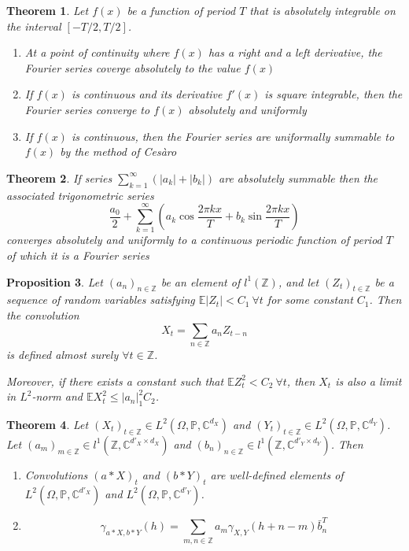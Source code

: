 \documentclass[12pt]{article}
\newtheorem{theorem}{Theorem}[section]
\newtheorem{proposition}[theorem]{Proposition}
\theoremstyle{definition}
\theoremstyle{remark}
\numberwithin{equation}{section}
\newcommand{\PP}{\mathbb{P}}
\newcommand{\ZZ}{\mathbb{Z}}
\newcommand{\CC}{\mathbb{C}}
\newcommand{\EE}{\mathbb{E}}
\begin{document}
\begin{theorem}
	Let $f(x)$ be a function of period $T$ that is absolutely integrable on the interval $[-T/2, T/2]$.
	\begin{enumerate}
		\item At a point of continuity where $f(x)$ has a right and a left derivative, the Fourier series coverge absolutely to the value $f(x)$
		\item If $f(x)$ is continuous and its derivative $f'(x)$ is square integrable, then the Fourier series converge to $f(x)$ absolutely and uniformly
		\item If $f(x)$ is continuous, then the Fourier series are uniformally summable to $f(x)$ by the method of Ces\`{a}ro
	\end{enumerate}
\end{theorem}

\begin{theorem}
	If series $\sum_{k=1}^{\infty}\left(|a_k| + |b_k|\right)$ are absolutely summable then the associated trigonometric series
\begin{equation*}
\frac {a_0} 2 + \sum_{k=1}^\infty \left( a_k \cos {\frac {2\pi kx}T}+b_k \sin {\frac {2\pi kx}T}\right)
\end{equation*}
	converges absolutely and uniformly to a continuous periodic function of period $T$ of which it is a Fourier series
\end{theorem}

\begin{proposition}
	Let $(a_n)_{n\in\ZZ}$ be an element of $l^1(\ZZ)$, and let $(Z_t)_{t\in\ZZ}$ be a sequence of random variables satisfying $\EE |Z_t| < C_1\ \forall t$ for some constant $C_1$. Then the convolution
	\begin{equation*}
		X_t = \sum_{n\in\ZZ}a_nZ_{t-n}
	\end{equation*}
	is defined almost surely $\forall t\in \ZZ$.

	Moreover, if there exists a constant such that $\EE Z_t^2 < C_2\ \forall t$, then $X_t$ is also a limit in $L^2$-norm and $\EE X_t^2\leq |a_n|_1^2C_2$.
\end{proposition}

\begin{theorem}
	Let $(X_t)_{t\in \ZZ}\in L^2\left(\Omega, \PP, \CC^{d_X}\right)$ and $(Y_t)_{t\in \ZZ}\in L^2\left(\Omega, \PP, \CC^{d_Y}\right)$. Let $(a_m)_{m\in\ZZ} \in l^1(\ZZ, \CC^{d'_X\times d_X})$ and $(b_n)_{n\in\ZZ} \in l^1(\ZZ, \CC^{d'_Y\times d_Y})$. Then
	\begin{enumerate}
		\item Convolutions $\left(a*X\right)_t$ and $\left(b*Y\right)_t$ are well-defined elements of $L^2\left(\Omega, \PP, \CC^{d'_X}\right)$ and $L^2\left(\Omega, \PP, \CC^{d'_Y}\right)$.
		\item \begin{equation*}
			\gamma_{a*X,b*Y}(h) = \sum_{m,n\in\ZZ}a_m\gamma_{X,Y}(h+n-m)\bar{b}_n^T %
		\end{equation*}
	\end{enumerate}
\end{theorem}
\end{document}
